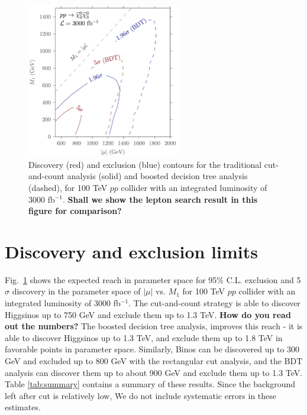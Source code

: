 \documentclass[a4paper,11pt]{article}
\newcommand{\Shufang}[1]{{\bf\color{Maroon}  #1}}
\begin{document}
\begin{figure}[h]
\centering
\includegraphics[width=0.6\textwidth]{images/dm_100_TeV_contours.png}

\caption{ Discovery (red) and exclusion (blue) contours for the traditional
  cut-and-count analysis (solid) and boosted decision tree analysis (dashed),
  for 100 TeV $pp$ collider with an integrated luminosity of 3000 fb$^{-1}$. \Shufang{Shall we show the lepton search result in this figure for comparison?} }

\label{fig:contours}
\end{figure}

\section{Discovery and exclusion limits}
\label{sec:results}

Fig.~\ref{fig:contours} shows the expected reach in parameter space for
95\% C.L. exclusion and 5$\sigma$ discovery in the parameter space of $|\mu|$ vs. $M_1$ for 100 TeV $pp$ collider with an integrated luminosity of 3000 fb$^{-1}$. The cut-and-count strategy is able to discover
Higgsinos up to 750 GeV  and exclude them up to 1.3 TeV. \Shufang{How do you read out the numbers?}  The boosted decision
tree analysis, improves this reach - it is able to discover Higgsinos up to 1.3
TeV, and exclude them up to 1.8 TeV in favorable points in parameter space.
Similarly, Binos can be discovered up to 300 GeV and excluded up to 800 GeV with
the rectangular cut analysis, and the BDT analysis can discover them up to about
900 GeV and exclude them up to 1.3 TeV. Table \ref{tab:summary} contains a
summary of these results. Since the background left after cut is relatively low, We do not include systematic errors in these
estimates.  
\end{document}
